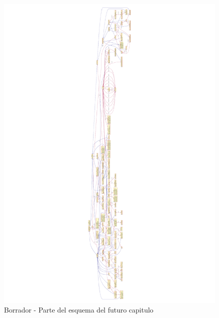 \begin{landscape}
	\begin{figure}
	  \includegraphics[angle=-90, width=1.0\linewidth]{appendices/JavaPrinting}
	  \caption{Borrador - Parte del esquema del futuro capitulo }
	  \label{fig:lan-networks-topologies-fig2}
	\end{figure}
\end{landscape}
 
